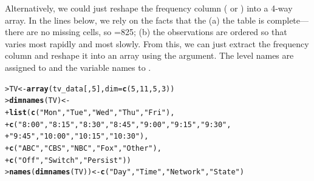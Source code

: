 \documentclass[10pt,krantz2]{krantz}\usepackage[]{graphicx}\usepackage[]{color}
\makeatletter
\newcommand{\hlnum}[1]{\textcolor[rgb]{0.686,0.059,0.569}{#1}}%
\newcommand{\hlstr}[1]{\textcolor[rgb]{0.192,0.494,0.8}{#1}}%
\newcommand{\hlstd}[1]{\textcolor[rgb]{0.345,0.345,0.345}{#1}}%
\newcommand{\hlkwb}[1]{\textcolor[rgb]{0.69,0.353,0.396}{#1}}%
\newcommand{\hlkwc}[1]{\textcolor[rgb]{0.333,0.667,0.333}{#1}}%
\newcommand{\hlkwd}[1]{\textcolor[rgb]{0.737,0.353,0.396}{\textbf{#1}}}%
\newenvironment{kframe}{%
 \def\at@end@of@kframe{}%
 \ifinner\ifhmode%
  \def\at@end@of@kframe{\end{minipage}}%
  \begin{minipage}{\columnwidth}%
 \fi\fi%
 \def\FrameCommand##1{\hskip\@totalleftmargin \hskip-\fboxsep
 \colorbox{shadecolor}{##1}\hskip-\fboxsep
     \hskip-\linewidth \hskip-\@totalleftmargin \hskip\columnwidth}%
 \MakeFramed {\advance\hsize-\width
   \@totalleftmargin\z@ \linewidth\hsize
   \@setminipage}}%
 {\par\unskip\endMakeFramed%
 \at@end@of@kframe}
\newenvironment{knitrout}{}{} %
\renewenvironment{knitrout}{\small\renewcommand{\baselinestretch}{.85}}{} %
\makeatother
\begin{document}
Alternatively, we could just reshape the frequency column
( or ) into
a 4-way array.
In the lines below, we rely on the facts that the
(a) the table is complete--- there are no missing cells,
so =825;
(b) the observations are ordered so that  varies most rapidly and
 most slowly.  From this, we can just extract the frequency column
and reshape it into an array using the  argument.
The level names are assigned to 
and the variable names to .
\begin{knitrout}
\color{fgcolor}\begin{kframe}
\begin{alltt}
\hlstd{> }\hlstd{TV} \hlkwb{<-} \hlkwd{array}\hlstd{(tv_data[,}\hlnum{5}\hlstd{],} \hlkwc{dim} \hlstd{=} \hlkwd{c}\hlstd{(}\hlnum{5}\hlstd{,} \hlnum{11}\hlstd{,} \hlnum{5}\hlstd{,} \hlnum{3}\hlstd{))}
\hlstd{> }\hlkwd{dimnames}\hlstd{(TV)} \hlkwb{<-}
\hlstd{+ }    \hlkwd{list}\hlstd{(}\hlkwd{c}\hlstd{(}\hlstr{"Mon"}\hlstd{,} \hlstr{"Tue"}\hlstd{,} \hlstr{"Wed"}\hlstd{,} \hlstr{"Thu"}\hlstd{,} \hlstr{"Fri"}\hlstd{),}
\hlstd{+ }         \hlkwd{c}\hlstd{(}\hlstr{"8:00"}\hlstd{,} \hlstr{"8:15"}\hlstd{,} \hlstr{"8:30"}\hlstd{,} \hlstr{"8:45"}\hlstd{,} \hlstr{"9:00"}\hlstd{,} \hlstr{"9:15"}\hlstd{,} \hlstr{"9:30"}\hlstd{,}
\hlstd{+ }           \hlstr{"9:45"}\hlstd{,} \hlstr{"10:00"}\hlstd{,} \hlstr{"10:15"}\hlstd{,} \hlstr{"10:30"}\hlstd{),}
\hlstd{+ }         \hlkwd{c}\hlstd{(}\hlstr{"ABC"}\hlstd{,} \hlstr{"CBS"}\hlstd{,} \hlstr{"NBC"}\hlstd{,} \hlstr{"Fox"}\hlstd{,} \hlstr{"Other"}\hlstd{),}
\hlstd{+ }         \hlkwd{c}\hlstd{(}\hlstr{"Off"}\hlstd{,} \hlstr{"Switch"}\hlstd{,} \hlstr{"Persist"}\hlstd{))}
\hlstd{> }\hlkwd{names}\hlstd{(}\hlkwd{dimnames}\hlstd{(TV))} \hlkwb{<-} \hlkwd{c}\hlstd{(}\hlstr{"Day"}\hlstd{,} \hlstr{"Time"}\hlstd{,} \hlstr{"Network"}\hlstd{,} \hlstr{"State"}\hlstd{)}
\end{alltt}
\end{kframe}
\end{knitrout}
\end{document}
